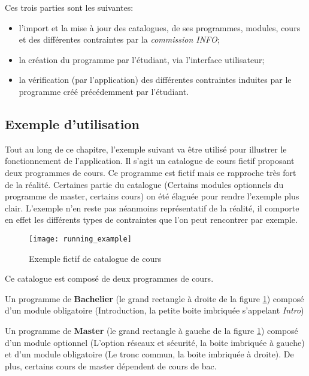Ces trois parties sont les suivantes:
\begin{itemize}
\item l'import et la mise à jour des catalogues, de ses programmes, modules, cours et des différentes contraintes par la \textit{commission INFO}; 
\item la création du programme par l'étudiant, via l'interface utilisateur;
\item la vérification (par l'application) des différentes contraintes induites par le programme créé précédemment par l'étudiant.
\end{itemize}

\subsection{Exemple d'utilisation}

Tout au long de ce chapitre, l'exemple suivant va être utilisé pour illustrer le fonctionnement de l'application. Il s'agit un catalogue de cours fictif proposant deux programmes de cours. Ce programme est fictif mais ce rapproche très fort de la réalité. Certaines partie du catalogue (Certains modules optionnels du programme de master, certains cours) on été élaguée pour rendre l'exemple plus clair. L'exemple n'en reste pas néanmoins représentatif de la réalité, il comporte en effet les différents types de contraintes que l'on peut rencontrer par exemple. 
\begin{figure}
\centering
\caption{Exemple fictif de catalogue de cours}
\label{fig:running_example}
\texttt{[image: running\_example]}
\end{figure}

Ce catalogue est composé de deux programmes de cours.

Un programme de \textbf{Bachelier} (le grand rectangle à droite de la figure \ref{fig:running_example}) composé d'un module obligatoire (Introduction, la petite boite imbriquée s’appelant \textit{Intro})

Un programme de \textbf{Master} (le grand rectangle à gauche de la figure \ref{fig:running_example}) composé d'un module optionnel (L'option réseaux et sécurité, la boite imbriquée à gauche) et d'un module obligatoire (Le tronc commun, la boite imbriquée à droite). De plus, certains cours de master dépendent de cours de bac. 

\subsection{}
 
